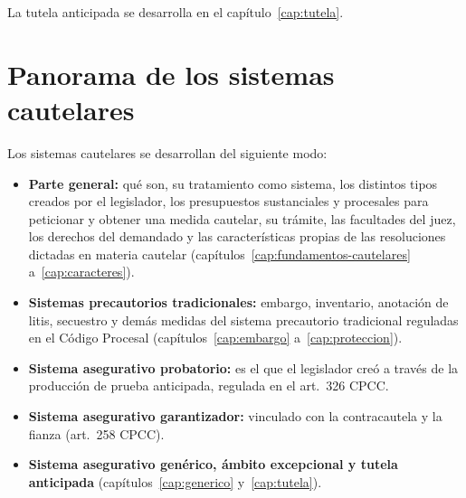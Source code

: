 \documentclass[12pt,oneside]{book}
\begin{document}
La tutela anticipada se desarrolla en el capítulo~\ref{cap:tutela}.

\section{Panorama de los sistemas cautelares}

Los sistemas cautelares se desarrollan del siguiente modo:
\begin{itemize}
    \item \textbf{Parte general:} qué son, su tratamiento como sistema, los distintos tipos creados por el legislador, los presupuestos sustanciales y procesales para peticionar y obtener una medida cautelar, su trámite, las facultades del juez, los derechos del demandado y las características propias de las resoluciones dictadas en materia cautelar (capítulos~\ref{cap:fundamentos-cautelares} a~\ref{cap:caracteres}).
    \item \textbf{Sistemas precautorios tradicionales:} embargo, inventario, anotación de litis, secuestro y demás medidas del sistema precautorio tradicional reguladas en el Código Procesal (capítulos~\ref{cap:embargo} a~\ref{cap:proteccion}).
    \item \textbf{Sistema asegurativo probatorio:} es el que el legislador creó a través de la producción de prueba anticipada, regulada en el art.~326 CPCC.
    \item \textbf{Sistema asegurativo garantizador:} vinculado con la contracautela y la fianza (art.~258 CPCC).
    \item \textbf{Sistema asegurativo genérico, ámbito excepcional y tutela anticipada} (capítulos~\ref{cap:generico} y~\ref{cap:tutela}).
\end{itemize}
\end{document}
